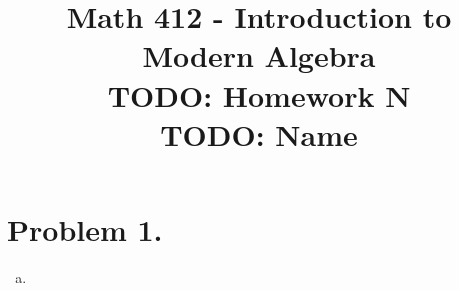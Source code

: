 \documentclass[12pt,oneside,english]{amsart}
\title{
Math 412 - Introduction to Modern Algebra \\
TODO: Homework N\\
TODO: Name}
\numberwithin{equation}{section}
\numberwithin{figure}{section}
\begin{document}
\maketitle

\section*{Problem 1.\label{sec:problem1.}}
\begin{enumerate}[(a)]
      \item
\end{enumerate}
\end{document}
